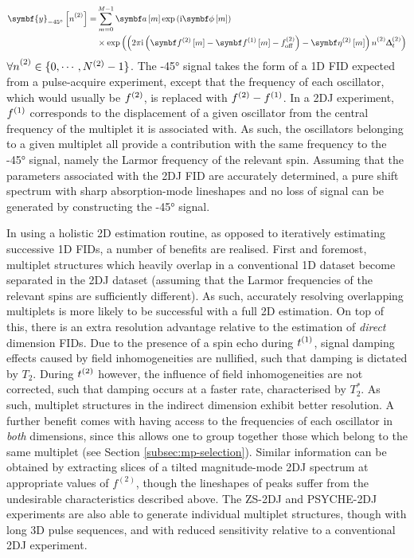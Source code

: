 \begin{equation}
    \begin{split}
        \symbf{y}_{\ang{-45}}\left[ \ntwo \right] =
            &\sum_{m=0}^{M-1} \bdam \exp \left(\iu \bdphim \right)\\
            &\times \exp\left(
                \left(
                    2 \pi \iu \left(\bdftwom - \bdfonem - \fofftwo\right)
                    - \bdetatwom
                \right) \ntwo \Dttwo
            \right)
    \end{split}
    \label{eq:neg-45}
\end{equation}
$\forall \ntwo \in \lbrace 0, \cdots, \Ntwo - 1 \rbrace$. The \ang{-45} signal
takes the form of a \ac{1D} \ac{FID} expected from a pulse-acquire experiment,
except that the frequency of each oscillator, which would usually be $f^{(2)}$,
is replaced with $f^{(2)} - f^{(1)}$. In a \ac{2DJ} experiment, $f^{(1)}$ corresponds
to the displacement of a given oscillator from the central frequency of the
multiplet it is associated with. As such, the oscillators belonging to a given
multiplet all provide a contribution with the same frequency to the \ang{-45}
signal, namely the Larmor frequency of the relevant spin. Assuming
that the parameters associated with the \ac{2DJ} \ac{FID} are accurately
determined, a pure shift spectrum with sharp absorption-mode lineshapes and no
loss of signal can be generated by constructing the \ang{-45} signal.

In using a holistic \ac{2D} estimation routine, as opposed to iteratively
estimating successive \ac{1D} \acp{FID}, a number of benefits are realised.
First and foremost, multiplet structures which heavily overlap in a
conventional \ac{1D} dataset become separated in the \ac{2DJ} dataset (assuming
that the Larmor frequencies of the relevant spins are sufficiently different).
As such, accurately resolving overlapping multiplets is more likely to be
successful with a full \ac{2D} estimation.
On top of this, there is an extra resolution advantage relative to the
estimation of \emph{direct} dimension \acp{FID}. Due to the presence of a spin
echo during $t^{(1)}$, signal damping effects caused by field inhomogeneities are
nullified, such that damping is dictated by $T_2$. During $t^{(2)}$ however, the
influence of field inhomogeneities are not corrected, such that damping occurs
at a faster rate, characterised by $T_2^*$. As such, multiplet structures in
the indirect dimension exhibit better resolution.
A further benefit comes with having access to the frequencies of each
oscillator in \emph{both} dimensions, since this allows one to group together
those which belong to the same multiplet (see Section
\ref{subsec:mp-selection}). Similar information can be obtained
by extracting slices of a tilted magnitude-mode \ac{2DJ} spectrum at
appropriate values of $f^{(2)}$, though the lineshapes of peaks suffer from the
undesirable characteristics described above. The
\ac{ZS}-\ac{2DJ}\cite{Pell2007} and
\ac{PSYCHE}-\ac{2DJ}\cite{Foroozandeh2015,Kiraly2017} experiments are also able
to generate individual multiplet structures, though with long \ac{3D} pulse
sequences, and with reduced sensitivity relative to a conventional \ac{2DJ}
experiment.

